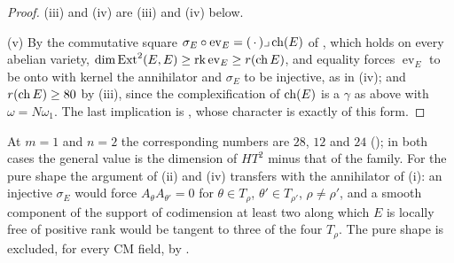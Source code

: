 \begin{proof}
(iii) and (iv) are (iii) and (iv) below.

(v) By the commutative square $\sigma_{E}\circ\operatorname{ev}_{E}=(\,\cdot\,)
\lrcorner\operatorname{ch}(E)$ of , which holds on every abelian
variety, $\dim\operatorname{Ext}^{2}(E,E)\ge\operatorname{rk}\operatorname{ev}_{E}\ge
r(\operatorname{ch} E)$, and equality forces $\operatorname{ev}_{E}$ to be onto with kernel
the annihilator and $\sigma_{E}$ to be injective, as in
(iv); and $r(\operatorname{ch} E)\ge80$ by (iii), since the
complexification of $\operatorname{ch}(E)$ is a $\gamma$ as above with $\omega=N\omega_{1}$.
The last implication is \cite[Theorem~17.7(v)]{paperI}, whose character is
exactly of this form.
\end{proof}

At $m=1$ and $n=2$ the corresponding numbers are $28$, $12$ and $24$
(); in both cases the general value is the dimension
of $HT^{2}$ minus that of the family. For the pure shape the argument of
(ii) and (iv) transfers with the annihilator of
(i): an injective $\sigma_{E}$ would force
$A_{\theta}A_{\theta'}=0$ for $\theta\in T_{\rho}$, $\theta'\in T_{\rho'}$,
$\rho\ne\rho'$, and a smooth component of the support of codimension at least
two along which $E$ is locally free of positive rank would be tangent to three
of the four $T_{\rho}$. The pure shape is excluded, for every CM
field, by .

